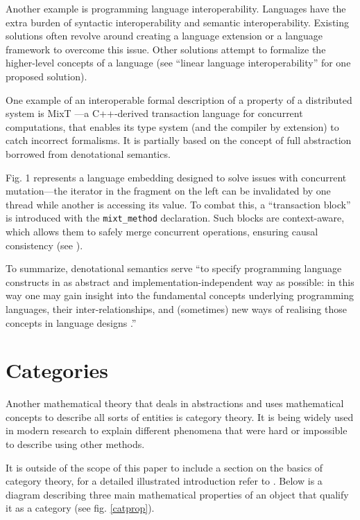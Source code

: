 \documentclass{article}
\begin{document}
Another example is programming language interoperability. Languages have the extra
burden of syntactic interoperability and semantic interoperability. Existing solutions often revolve
around creating a language extension or a language framework to overcome this issue. Other
solutions attempt to formalize the higher-level concepts of a language (see “linear language
interoperability” \cite{Scherer} for one proposed solution).

One example of an interoperable formal description of a property of a distributed system
is MixT \cite{Milano}---a C++-derived transaction language for concurrent computations, that enables its
type system (and the compiler by extension) to catch incorrect formalisms. It is partially based on
the concept of full abstraction borrowed from denotational semantics.

Fig. 1 represents a language embedding designed to solve issues with concurrent mutation---the iterator in the fragment on the left can be invalidated by one thread while another is accessing its value. To combat this, a “transaction block” is introduced with the \lstinline{mixt_method} declaration. Such blocks are context-aware, which allows them to safely merge concurrent operations, ensuring
causal consistency (see \cite{Milano}).


To summarize, denotational semantics serve “to specify programming language constructs
in as abstract and implementation-independent way as possible: in this way one may gain insight
into the fundamental concepts underlying programming languages, their inter-relationships, and
(sometimes) new ways of realising those concepts in language designs \cite{Scott}.”

\section*{Categories}

Another mathematical theory that deals in abstractions and uses mathematical concepts to
describe all sorts of entities is category theory. It is being widely used in modern research to
explain different phenomena that were hard or impossible to describe using other methods.

It is outside of the scope of this paper to include a section on the basics of category theory,
for a detailed illustrated introduction refer to \cite{Tsuchiya}. Below is a diagram describing three main
mathematical properties of an object that qualify it as a category (see fig. \ref{catprop}).
\end{document}
